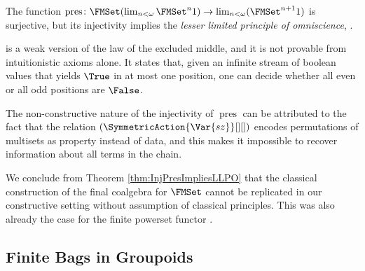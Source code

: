 \documentclass{easychair}
\begin{document}
  \begin{theorem}\label{thm:InjPresImpliesLLPO}
    The function 
        $\operatorname{pres}\colon
            \FMSet (\lim_{n < \omega} \FMSet^n 1)
            \to
            \lim_{n < \omega} (\FMSet^{n+1} 1)$
    is surjective,
    but its injectivity implies the \emph{lesser limited principle of omniscience}, \LLPO.
  \end{theorem}
  \LLPO{} \cite[{Ch.\@ 1}]{Bridges1987} is a weak version of the law
  of the excluded middle, and it is not provable from intuitionistic
  axioms alone.  It states that, given an infinite stream of boolean
  values that yields $\True$ in at most one position, one can decide
  whether all even or all odd positions are $\False$.

  The non-constructive nature of the injectivity of
  $\operatorname{pres}$ can be attributed to the fact that the
  relation $(\SymmetricAction{\Var{sz}}[][])$ encodes permutations of
  multisets as property instead of data, and this makes it impossible
  to recover information about all terms in the chain.

  We conclude from Theorem \ref{thm:InjPresImpliesLLPO} that the
  classical construction of the final coalgebra for $\FMSet$ cannot be
  replicated in our constructive setting without assumption of
  classical principles. This was also already the case for the finite
  powerset functor \cite{Veltri2021}.

  \subsection*{Finite Bags in Groupoids}
\end{document}
